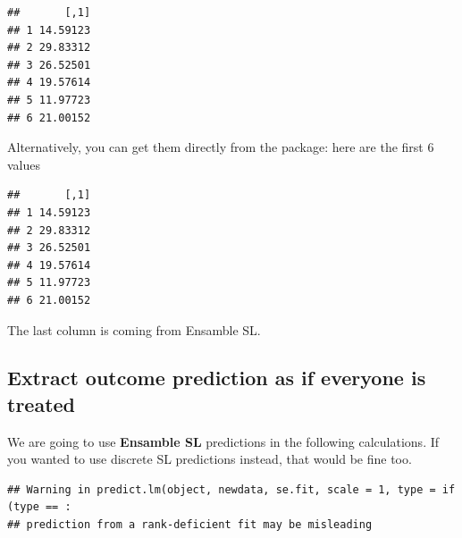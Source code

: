 \documentclass[
]{book}
\newenvironment{Shaded}{\begin{snugshade}}{\end{snugshade}}
\newcommand{\AttributeTok}[1]{\textcolor[rgb]{0.77,0.63,0.00}{#1}}
\newcommand{\DecValTok}[1]{\textcolor[rgb]{0.00,0.00,0.81}{#1}}
\newcommand{\FunctionTok}[1]{\textcolor[rgb]{0.00,0.00,0.00}{#1}}
\newcommand{\NormalTok}[1]{#1}
\newcommand{\OtherTok}[1]{\textcolor[rgb]{0.56,0.35,0.01}{#1}}
\newcommand{\SpecialCharTok}[1]{\textcolor[rgb]{0.00,0.00,0.00}{#1}}
\newcommand{\StringTok}[1]{\textcolor[rgb]{0.31,0.60,0.02}{#1}}
\begin{document}
\begin{verbatim}
##       [,1]
## 1 14.59123
## 2 29.83312
## 3 26.52501
## 4 19.57614
## 5 11.97723
## 6 21.00152
\end{verbatim}

Alternatively, you can get them directly from the package: here are the first 6 values

\begin{Shaded}
\end{Shaded}

\begin{verbatim}
##       [,1]
## 1 14.59123
## 2 29.83312
## 3 26.52501
## 4 19.57614
## 5 11.97723
## 6 21.00152
\end{verbatim}

The last column is coming from Ensamble SL.

\hypertarget{extract-outcome-prediction-as-if-everyone-is-treated-2}{%
\subsection{Extract outcome prediction as if everyone is treated}\label{extract-outcome-prediction-as-if-everyone-is-treated-2}}

We are going to use \textbf{Ensamble SL} predictions in the following calculations. If you wanted to use discrete SL predictions instead, that would be fine too.

\begin{Shaded}
\end{Shaded}

\begin{verbatim}
## Warning in predict.lm(object, newdata, se.fit, scale = 1, type = if (type == :
## prediction from a rank-deficient fit may be misleading
\end{verbatim}
\end{document}
